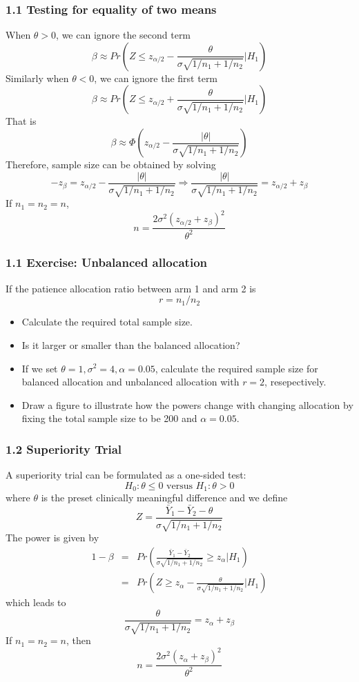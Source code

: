 \documentclass[table,10pt]{beamer}
\begin{document}
\begin{CJK*}{UTF8}{gbsn}
\begin{frame}[t]
\frametitle{1.1 Testing for equality of two means}
When $\theta > 0$, we can ignore the second term
$$
\beta \approx Pr\left( Z \le z_{\alpha/2} - \frac{\theta}{\sigma \sqrt{1/n_1 + 1/n_2}} \big| H_1\right)
$$
Similarly when $\theta < 0$, we can ignore the first term
$$
\beta \approx Pr\left(Z \le z_{\alpha/2} + \frac{\theta}{\sigma \sqrt{1/n_1 + 1/n_2}} \big| H_1 \right)
$$
That is
$$
\beta \approx \Phi\left( z_{\alpha/2} - \frac{|\theta|}{\sigma \sqrt{1/n_1 + 1/n_2}} \right)
$$
Therefore, sample size can be obtained by solving
$$
-z_{\beta} = z_{\alpha/2} - \frac{|\theta|}{\sigma \sqrt{1/n_1 + 1/n_2}} \Rightarrow \frac{|\theta|}{\sigma \sqrt{1/n_1 + 1/n_2}} = z_{\alpha/2} + z_{\beta}
$$
If $n_1 = n_2 = n$,
$$
n = \frac{2\sigma^2(z_{\alpha/2}+z_{\beta})^2}{\theta^2} 
$$
\end{frame}


\begin{frame}[t]
\frametitle{1.1 Exercise: Unbalanced allocation}
If the patience allocation ratio between arm 1 and arm 2 is
$$
r = n_1/n_2
$$
\begin{itemize}
	\item Calculate the required total sample size.
	\item Is it larger or smaller than the balanced allocation?
	\item If we set $\theta=1, \sigma^2 = 4, \alpha=0.05$, calculate the required sample size 
		for balanced allocation and unbalanced allocation with $r=2$, resepectively.
	\item Draw a figure to illustrate how the powers change with changing allocation by fixing 
		the total sample size to be 200 and $\alpha=0.05$. 
\end{itemize}
\end{frame}


\begin{frame}[t]
\frametitle{1.2 Superiority Trial}
A superiority trial can be formulated as a one-sided test:
$$
H_0: \theta \le 0 \mbox{ versus } H_1: \theta > 0
$$
where $\theta$ is the preset clinically meaningful difference and we define
$$
Z = \frac{\bar{Y}_1 - \bar{Y}_2 - \theta}{\sigma \sqrt{1/n_1 + 1/n_2}}
$$
The power is given by
$$
\begin{array}{lcl}
1 - \beta &=& Pr \left( \frac{\bar{Y}_1 - \bar{Y}_2}{\sigma\sqrt{1/n_1 + 1/n_2}} \ge z_{\alpha} \big| H_1\right)\\
&=& Pr \left( Z \ge z_{\alpha} - \frac{\theta}{\sigma \sqrt{1/n_1 + 1/n_2}} \big| H_1 \right)
\end{array}
$$
which leads to
$$
\frac{\theta}{\sigma \sqrt{1/n_1 + 1/n_2}} = z_{\alpha} + z_{\beta}
$$
If $n_1 = n_2 = n$, then
$$
n = \frac{2\sigma^2(z_{\alpha} + z_{\beta})^2}{\theta^2}
$$
\end{frame}


\end{CJK*}
\end{document}
